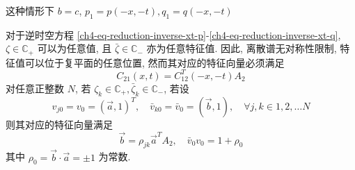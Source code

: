 \begin{theorem}[逆时空] \label{ch4-thm:inverse-space-time}
    这种情形下 $ b = c $, $ p_{1} = p(-x,-t), q_{1} = q(-x,-t) $

    对于逆时空方程 \eqref{ch4-eq-reduction-inverse-xt-p}-\eqref{ch4-eq-reduction-inverse-xt-q}, $ \zeta \in \mathbb{C}_{+}$ 可以为任意值, 且 $ \bar{\zeta} \in \mathbb{C}_{-}$ 亦为任意特征值. 因此, 离散谱无对称性限制, 特征值可以位于复平面的任意位置, 然而其对应的特征向量必须满足
    \begin{equation}
        C_{21}(x,t) = C_{12}^{T}(-x, -t) A_{2}
    \end{equation}
    对任意正整数 $N$, 若 $ \zeta_{k} \in \mathbb{C}_{+}, \bar{\zeta}_{k} \in \mathbb{C}_{-} $, 若设
    \begin{equation}
        v_{j0} = v_{0} = (\vec{a}, 1)^{T}, \quad \bar{v}_{k0} = \bar{v}_{0} = (\vec{b}, 1), \quad \forall j, k \in 1, 2, \dots N
    \end{equation}
    则其对应的特征向量满足
    \begin{equation}
        \vec{b} = \rho_{jk}\vec{a}^{T} A_{2}, \quad \bar{v}_{0} v_{0} = 1+ \rho_{0}
        \label{eq:3-NLS-reverse-x-t-eigenvector-symmetry}
    \end{equation}
    其中 $\rho_{0} = \vec{b} \cdot \vec{a} = \pm 1$ 为常数.
\end{theorem}
